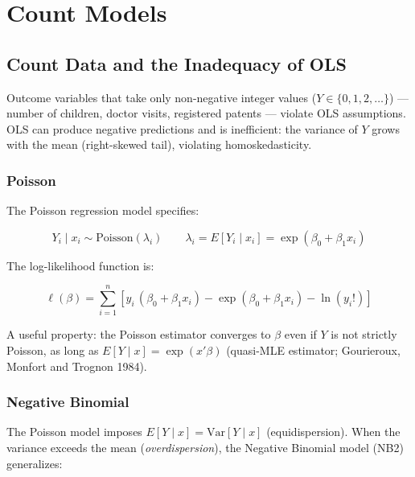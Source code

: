 \chapter{Count Models}
\label{cap:contagem}

\section{Count Data and the Inadequacy of OLS}

Outcome variables that take only non-negative integer values
($Y \in \{0,1,2,\ldots\}$) — number of children, doctor visits, registered
patents — violate OLS assumptions. OLS can produce negative predictions and
is inefficient: the variance of $Y$ grows with the mean (right-skewed tail),
violating homoskedasticity.

\subsection*{Poisson}

The Poisson regression model specifies:

\[
  Y_i \mid x_i \sim \mathrm{Poisson}(\lambda_i)
  \qquad
  \lambda_i = E[Y_i \mid x_i] = \exp(\beta_0 + \beta_1 x_i)
\]

The log-likelihood function is:

\[
  \ell(\beta) = \sum_{i=1}^n \left[ y_i\,(\beta_0 + \beta_1 x_i) - \exp(\beta_0 + \beta_1 x_i) - \ln(y_i!) \right]
\]

A useful property: the Poisson estimator converges to $\beta$ even if
$Y$ is not strictly Poisson, as long as $E[Y\mid x] = \exp(x'\beta)$
(quasi-MLE estimator; Gourieroux, Monfort and Trognon 1984).

\subsection*{Negative Binomial}

The Poisson model imposes $E[Y\mid x] = \mathrm{Var}[Y\mid x]$ (equidispersion).
When the variance exceeds the mean (\emph{overdispersion}), the Negative
Binomial model (NB2) generalizes:


